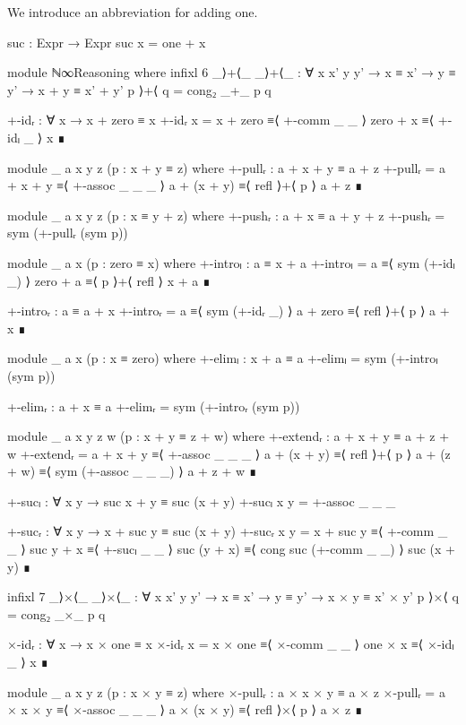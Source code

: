 We introduce an abbreviation for adding one.
\begin{code}
  suc : Expr → Expr
  suc x = one + x
\end{code}
\begin{code}[hide]
  module ℕ∞Reasoning where
    infixl 6 _⟩+⟨_
    _⟩+⟨_ : ∀ {x x' y y'} → x ≡ x' → y ≡ y' → x + y ≡ x' + y'
    p ⟩+⟨ q = cong₂ _+_ p q

    +-idᵣ : ∀ x → x + zero ≡ x
    +-idᵣ x =
      x + zero ≡⟨ +-comm _ _ ⟩
      zero + x ≡⟨ +-idₗ _ ⟩
      x        ∎

    module _ {a x y z} (p : x + y ≡ z) where
      +-pullᵣ : a + x + y ≡ a + z
      +-pullᵣ =
        a + x + y   ≡⟨ +-assoc _ _ _ ⟩
        a + (x + y) ≡⟨ refl ⟩+⟨ p ⟩
        a + z       ∎

    module _ {a x y z} (p : x ≡ y + z) where
      +-pushᵣ : a + x ≡ a + y + z
      +-pushᵣ = sym (+-pullᵣ (sym p))

    module _ {a x} (p : zero ≡ x) where
      +-introₗ : a ≡ x + a
      +-introₗ =
        a        ≡⟨ sym (+-idₗ _) ⟩
        zero + a ≡⟨ p ⟩+⟨ refl ⟩
        x + a    ∎

      +-introᵣ : a ≡ a + x
      +-introᵣ =
        a        ≡⟨ sym (+-idᵣ _) ⟩
        a + zero ≡⟨ refl ⟩+⟨ p ⟩
        a + x    ∎

    module _ {a x} (p : x ≡ zero) where
      +-elimₗ : x + a ≡ a
      +-elimₗ = sym (+-introₗ (sym p))

      +-elimᵣ : a + x ≡ a
      +-elimᵣ = sym (+-introᵣ (sym p))

    module _ {a x y z w} (p : x + y ≡ z + w) where
      +-extendᵣ : a + x + y ≡ a + z + w
      +-extendᵣ =
        a + x + y   ≡⟨ +-assoc _ _ _ ⟩
        a + (x + y) ≡⟨ refl ⟩+⟨ p ⟩
        a + (z + w) ≡⟨ sym (+-assoc _ _ _) ⟩
        a + z + w   ∎

    +-sucₗ : ∀ x y → suc x + y ≡ suc (x + y)
    +-sucₗ x y = +-assoc _ _ _

    +-sucᵣ : ∀ x y → x + suc y ≡ suc (x + y)
    +-sucᵣ x y =
      x + suc y   ≡⟨ +-comm _ _ ⟩
      suc y + x   ≡⟨ +-sucₗ _ _ ⟩
      suc (y + x) ≡⟨ cong suc (+-comm _ _) ⟩
      suc (x + y) ∎

    infixl 7 _⟩×⟨_
    _⟩×⟨_ : ∀ {x x' y y'} → x ≡ x' → y ≡ y' → x × y ≡ x' × y'
    p ⟩×⟨ q = cong₂ _×_ p q

    ×-idᵣ : ∀ x → x × one ≡ x
    ×-idᵣ x =
      x × one ≡⟨ ×-comm _ _ ⟩
      one × x ≡⟨ ×-idₗ _ ⟩
      x       ∎

    module _ {a x y z} (p : x × y ≡ z) where
      ×-pullᵣ : a × x × y ≡ a × z
      ×-pullᵣ =
        a × x × y   ≡⟨ ×-assoc _ _ _ ⟩
        a × (x × y) ≡⟨ refl ⟩×⟨ p ⟩
        a × z       ∎


\end{code}
